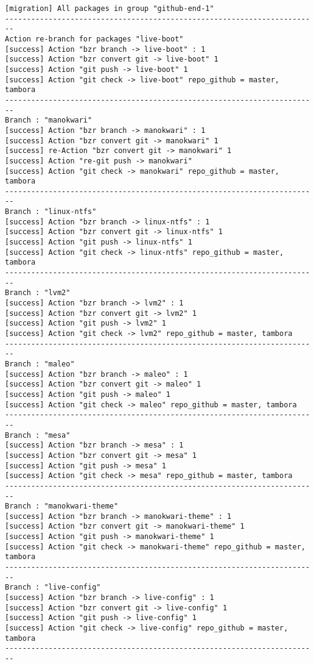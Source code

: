 {\begin{lstlisting}[language=ShellBash2]
[migration] All packages in group "github-end-1" 
------------------------------------------------------------------------
Action re-branch for packages "live-boot" 
[success] Action "bzr branch -> live-boot" : 1
[success] Action "bzr convert git -> live-boot" 1
[success] Action "git push -> live-boot" 1
[success] Action "git check -> live-boot" repo_github = master, tambora
------------------------------------------------------------------------
Branch : "manokwari"
[success] Action "bzr branch -> manokwari" : 1
[success] Action "bzr convert git -> manokwari" 1
[success] re-Action "bzr convert git -> manokwari" 1
[success] Action "re-git push -> manokwari" 
[success] Action "git check -> manokwari" repo_github = master, tambora
------------------------------------------------------------------------
Branch : "linux-ntfs"
[success] Action "bzr branch -> linux-ntfs" : 1
[success] Action "bzr convert git -> linux-ntfs" 1
[success] Action "git push -> linux-ntfs" 1
[success] Action "git check -> linux-ntfs" repo_github = master, tambora
------------------------------------------------------------------------
Branch : "lvm2"
[success] Action "bzr branch -> lvm2" : 1
[success] Action "bzr convert git -> lvm2" 1
[success] Action "git push -> lvm2" 1
[success] Action "git check -> lvm2" repo_github = master, tambora
------------------------------------------------------------------------
Branch : "maleo"
[success] Action "bzr branch -> maleo" : 1
[success] Action "bzr convert git -> maleo" 1
[success] Action "git push -> maleo" 1
[success] Action "git check -> maleo" repo_github = master, tambora
------------------------------------------------------------------------
Branch : "mesa"
[success] Action "bzr branch -> mesa" : 1
[success] Action "bzr convert git -> mesa" 1
[success] Action "git push -> mesa" 1
[success] Action "git check -> mesa" repo_github = master, tambora
------------------------------------------------------------------------
Branch : "manokwari-theme"
[success] Action "bzr branch -> manokwari-theme" : 1
[success] Action "bzr convert git -> manokwari-theme" 1
[success] Action "git push -> manokwari-theme" 1
[success] Action "git check -> manokwari-theme" repo_github = master, tambora
------------------------------------------------------------------------
Branch : "live-config"
[success] Action "bzr branch -> live-config" : 1
[success] Action "bzr convert git -> live-config" 1
[success] Action "git push -> live-config" 1
[success] Action "git check -> live-config" repo_github = master, tambora
------------------------------------------------------------------------

\end{lstlisting}}
